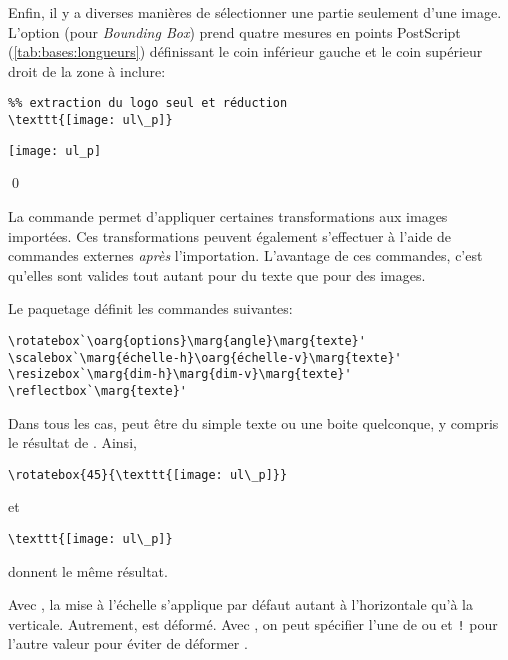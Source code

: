 \begin{exemple}
  Enfin, il y a diverses manières de sélectionner une partie seulement
  d'une image. L'option  (pour \emph{Bounding Box}) prend
  quatre mesures en points PostScript (\autoref{tab:bases:longueurs})
  définissant le coin inférieur gauche et le coin supérieur droit de
  la zone à inclure:
  \begin{demo}
    \begin{texample}[0.72\linewidth]
\begin{lstlisting}
%% extraction du logo seul et réduction
\texttt{[image: ul\_p]}
\end{lstlisting}
      \producing
      \texttt{[image: ul\_p]}
    \end{texample}
  \end{demo}
  \qed
\end{exemple}

La commande  permet d'appliquer certaines
transformations aux images importées. Ces transformations peuvent
également s'effectuer à l'aide de commandes externes \emph{après}
l'importation. L'avantage de ces commandes, c'est qu'elles sont
valides tout autant pour du texte que pour des images.

Le paquetage  définit les commandes suivantes:
\begin{lstlisting}
\rotatebox`\oarg{options}\marg{angle}\marg{texte}'
\scalebox`\marg{échelle-h}\oarg{échelle-v}\marg{texte}'
\resizebox`\marg{dim-h}\marg{dim-v}\marg{texte}'
\reflectbox`\marg{texte}'
\end{lstlisting}
Dans tous les cas,  peut être du simple texte ou une boite
quelconque, y compris le résultat de . Ainsi,
\begin{lstlisting}
\rotatebox{45}{\texttt{[image: ul\_p]}}
\end{lstlisting}
et
\begin{lstlisting}
\texttt{[image: ul\_p]}
\end{lstlisting}
donnent le même résultat.

Avec \cmd{\scalebox}, la mise à l'échelle  s'applique
par défaut autant à l'horizontale qu'à la verticale. Autrement,
 est déformé.  Avec \cmd{\resizebox}, on peut spécifier
l'une de  ou  et \verb=!= pour l'autre valeur
pour éviter de déformer .

